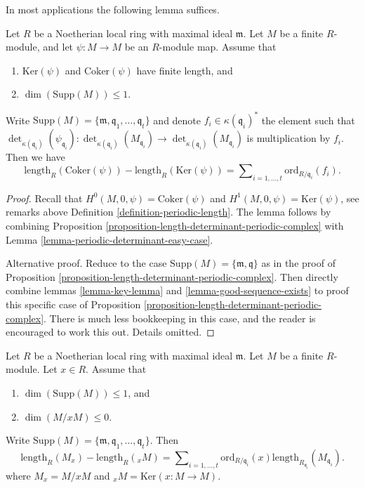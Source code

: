 \noindent
In most applications the following lemma suffices.

\begin{lemma}
\label{lemma-application-herbrand-quotient}
Let $R$ be a Noetherian local ring with maximal ideal $\mathfrak m$.
Let $M$ be a finite $R$-module, and let $\psi : M \to M$ be an
$R$-module map. Assume that
\begin{enumerate}
\item $\text{Ker}(\psi)$ and $\text{Coker}(\psi)$ have finite length, and
\item $\dim(\text{Supp}(M)) \leq 1$.
\end{enumerate}
Write
$\text{Supp}(M) = \{\mathfrak m, \mathfrak q_1, \ldots, \mathfrak q_t\}$
and denote $f_i \in \kappa(\mathfrak q_i)^*$ the element such that
$\det_{\kappa(\mathfrak q_i)}(\psi_{\mathfrak q_i}) :
\det_{\kappa(\mathfrak q_i)}(M_{\mathfrak q_i})
\to \det_{\kappa(\mathfrak q_i)}(M_{\mathfrak q_i})$
is multiplication by $f_i$. Then
we have
$$
\text{length}_R(\text{Coker}(\psi))
-
\text{length}_R(\text{Ker}(\psi))
=
\sum\nolimits_{i = 1, \ldots, t}
\text{ord}_{R/\mathfrak q_i}(f_i).
$$
\end{lemma}

\begin{proof}
Recall that $H^0(M, 0, \psi) = \text{Coker}(\psi)$ and
$H^1(M, 0, \psi) = \text{Ker}(\psi)$, see remarks above
Definition \ref{definition-periodic-length}.
The lemma follows by combining
Proposition \ref{proposition-length-determinant-periodic-complex} with
Lemma \ref{lemma-periodic-determinant-easy-case}.

\medskip\noindent
Alternative proof. Reduce to the case
$\text{Supp}(M) = \{\mathfrak m, \mathfrak q\}$
as in the proof of
Proposition \ref{proposition-length-determinant-periodic-complex}.
Then directly combine lemmas \ref{lemma-key-lemma}
and \ref{lemma-good-sequence-exists} to proof this
specific case of
Proposition \ref{proposition-length-determinant-periodic-complex}.
There is much less bookkeeping in this case, and the reader is
encouraged to work this out. Details omitted.
\end{proof}

\begin{lemma}
\label{lemma-length-multiplication}
Let $R$ be a Noetherian local ring with maximal ideal $\mathfrak m$.
Let $M$ be a finite $R$-module.
Let $x \in R$.
Assume that
\begin{enumerate}
\item $\dim(\text{Supp}(M)) \leq 1$, and
\item $\dim(M/xM) \leq 0$.
\end{enumerate}
Write
$\text{Supp}(M) = \{\mathfrak m, \mathfrak q_1, \ldots, \mathfrak q_t\}$.
Then
$$
\text{length}_R(M_x)
-
\text{length}_R({}_xM)
=
\sum\nolimits_{i = 1, \ldots, t}
\text{ord}_{R/\mathfrak q_i}(x)
\text{length}_{R_{\mathfrak q_i}}(M_{\mathfrak q_i}).
$$
where $M_x = M/xM$ and ${}_xM = \text{Ker}(x : M \to M)$.
\end{lemma}

